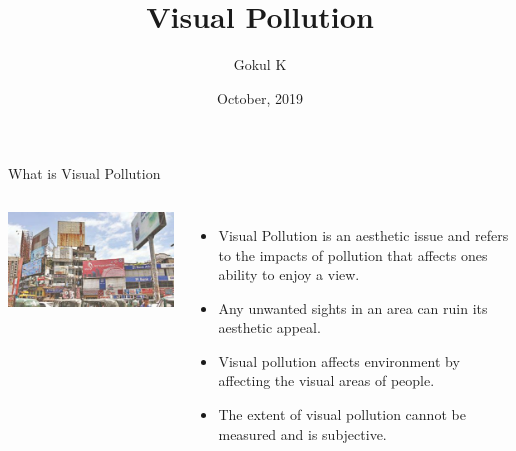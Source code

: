 \documentclass{beamer}
\begin{document}
\title{Visual Pollution}
\author{Gokul K}
\date{October, 2019}

\begin{frame}
    \titlepage
\end{frame}

    \begin{frame}{What is Visual Pollution}

        \begin{columns}
                \includegraphics[height=.79\textwidth,width=.99\textwidth]{img/vp.jpg}
            \begin{itemize}
                \item Visual Pollution is an aesthetic issue and refers to the impacts of pollution that affects ones ability to enjoy a view.  
                \item Any unwanted sights in an area can ruin its aesthetic appeal.
                \item Visual pollution affects environment by affecting the visual areas of people.
                \item The extent of visual pollution cannot be measured and is subjective.
            \end{itemize}
                
        \end{columns}
    \end{frame}
\end{document}
